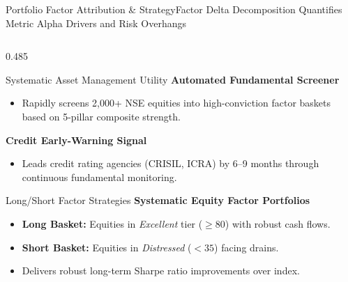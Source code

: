 \begin{frame}{Portfolio Factor Attribution \& Strategy}{Factor Delta Decomposition Quantifies Metric Alpha Drivers and Risk Overhangs}
\begin{columns}[T,onlytextwidth]
        \begin{column}{0.485\textwidth}
            \begin{quantcard}[height=2.74cm]{Systematic Asset Management Utility}
                \fontsize{5.6pt}{6.8pt}\selectfont
                \textbf{\color{deepemerald}Automated Fundamental Screener}
                \begin{itemize}
                    \setlength{\itemsep}{0.4pt}
                    \item Rapidly screens 2,000+ NSE equities into high-conviction factor baskets based on 5-pillar composite strength.
                \end{itemize}
                \textbf{\color{deepemerald}Credit Early-Warning Signal}
                \begin{itemize}
                    \setlength{\itemsep}{0.4pt}
                    \item Leads credit rating agencies (CRISIL, ICRA) by 6--9 months through continuous fundamental monitoring.
                \end{itemize}
            \end{quantcard}

            \vspace{0.12cm}

            \begin{quantcard}[height=2.74cm]{Long/Short Factor Strategies}
                \fontsize{5.5pt}{6.7pt}\selectfont
                \textbf{\color{deepemerald}Systematic Equity Factor Portfolios}
                \begin{itemize}
                    \setlength{\itemsep}{0.2pt}
                    \item \textbf{Long Basket:} Equities in \textit{Excellent} tier ($\ge 80$) with robust cash flows.
                    \item \textbf{Short Basket:} Equities in \textit{Distressed} ($< 35$) facing drains.
                    \item Delivers robust long-term Sharpe ratio improvements over index.
                \end{itemize}
                \vspace{2pt}
            \end{quantcard}
        \end{column}
    \end{columns}
\end{frame}
